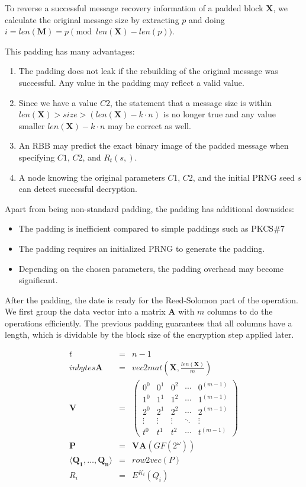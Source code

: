 To reverse a successful message recovery information of a padded block $\mathbf{X}$, we calculate the original message size by extracting $p$ and doing $i=len(\mathbf{M})=p \pmod{ len\left(\mathbf{X}\right)-len\left(p\right) }$.

This padding has many advantages:
\begin{enumerate}
	\item The padding does not leak if the rebuilding of the original message was successful. Any value in the padding may reflect a valid value.
	\item Since we have a value $C2$, the statement that a message size is within $len(\mathbf{X})>size>(len(\mathbf{X})-k\cdot n)$ is no longer true and any value smaller $len(\mathbf{X})-k\cdot n$ may be correct as well.
	\item An RBB may predict the exact binary image of the padded message when specifying $C1$, $C2$, and $R_{t}(s,)$.
	\item A node knowing the original parameters $C1$, $C2$, and the initial PRNG seed $s$ can detect successful decryption.
\end{enumerate}

Apart from being non-standard padding, the padding has additional downsides:
\begin{itemize}
	\item The padding is inefficient compared to simple paddings such as PKCS\#7
	\item The padding requires an initialized PRNG to generate the padding.
	\item Depending on the chosen parameters, the padding overhead may become significant. 
\end{itemize}

After the padding, the date is ready for the Reed-Solomon part of the operation. We first group the data vector into a matrix $\mathbf{A}$ with $m$ columns to do the operations efficiently. The previous padding guarantees that all columns have a length, which is dividable by the block size of the encryption step applied later.

\begin{eqnarray}
t          & = & n-1\\in bytes
\mathbf{A} & = & vec2mat\left(\mathbf{X},\frac{len\left(\mathbf{X}\right)}{m}\right)\\
\mathbf{V} & = & \left(\begin{matrix}
0^0 & 0^1 & 0^2 & \cdots & 0^{(m-1)} \\
1^0 & 1^1 & 1^2 & \cdots & 1^{(m-1)} \\
2^0 & 2^1 & 2^2 & \cdots & 2^{(m-1)} \\
\vdots & \vdots & \vdots & \ddots & \vdots \\
t^0 & t^1 & t^2 & \cdots & t^{(m-1)}
\end{matrix}\right)\\
\mathbf{P} & = & \mathbf{V}\mathbf{A} \left(GF\left(2^\omega\right)\right)\\
\langle \mathbf{Q_1}, \ldots , \mathbf{Q_n} \rangle & = & row2vec(P)\\
R_i & = & E^{K_i}\left(Q_i\right)
\end{eqnarray}    

